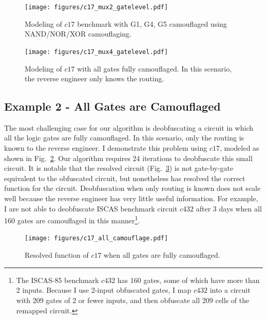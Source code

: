 \documentclass[proposal]{umassthesis}  %
\begin{document}
\begin{figure}[!htb] 
\begin{center}
\texttt{[image: figures/c17\_mux2\_gatelevel.pdf]}
\caption{Modeling of $c17$ benchmark with G1, G4, G5 camouflaged using NAND/NOR/XOR camouflaging.}
\label{fig:c17_mux2}
\end{center}
\end{figure}

\begin{figure}[!htb] 
\begin{center}
\texttt{[image: figures/c17\_mux4\_gatelevel.pdf]}
\caption{Modeling of $c17$ with all gates fully camouflaged. In this scenario, the reverse engineer only knows the routing.}
\label{fig:c17_mux4}
\end{center}
\end{figure}



\subsection{Example 2 - All Gates are Camouflaged}

The most challenging case for our algorithm is deobfuscating a circuit in which all the logic gates are fully camouflaged. In this scenario, only the routing is known to the reverse engineer. I demonstrate this problem using $c17$, modeled as shown in Fig.~\ref{fig:c17_mux4}. Our algorithm requires 24 iterations to deobfuscate this small circuit. It is notable that the resolved circuit (Fig.~\ref{fig:c17_all}) is not gate-by-gate equivalent to the obfuscated circuit, but nonetheless has resolved the correct function for the circuit. Deobfuscation when only routing is known does not scale well because the reverse engineer has very little useful information. For example, I are not able to deobfuscate ISCAS benchmark circuit $c432$ after 3 days when all 160 gates are camouflaged in this manner\footnote{The ISCAS-85 benchmark $c432$ has 160 gates, some of which have more than 2 inputs. Because I use 2-input obfuscated gates, I map $c432$ into a circuit with 209 gates of 2 or fewer inputs, and then obfuscate all 209 cells of the remapped circuit.}.


\begin{figure}[htb] 
\begin{center}
\texttt{[image: figures/c17\_all\_camouflage.pdf]}
\caption{Resolved function of $c17$ when all gates are fully camouflaged.}
\label{fig:c17_all}
\end{center}
\end{figure}
\end{document}
